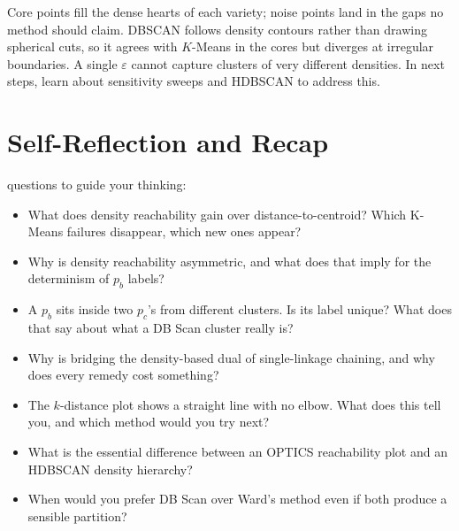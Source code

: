 Core points fill the dense hearts of each variety; noise points land in the
gaps no method should claim.
DBSCAN follows density contours rather than drawing spherical cuts, so it
agrees with $K$-Means in the cores but diverges at irregular boundaries.
A single $\varepsilon$ cannot capture clusters of very different densities. 
In next steps, learn about sensitivity sweeps and HDBSCAN to address this.



\section{Self-Reflection and Recap}

 questions to guide your thinking:
\begin{itemize}
    \item What does density reachability gain over distance-to-centroid? Which K-Means failures disappear, which new ones appear?
    \item Why is density reachability asymmetric, and what does that imply for the determinism of $p_b$ labels?
    \item A $p_b$ sits inside two $p_c$'s from different clusters. Is its label unique? What does that say about what a DB Scan cluster really is?
    \item Why is bridging the density-based dual of single-linkage chaining, and why does every remedy cost something?
    \item The $k$-distance plot shows a straight line with no elbow. What does this tell you, and which method would you try next?
    \item What is the essential difference between an OPTICS reachability plot and an HDBSCAN density hierarchy?
    \item When would you prefer DB Scan over Ward's method even if both produce a sensible partition?
\end{itemize}

